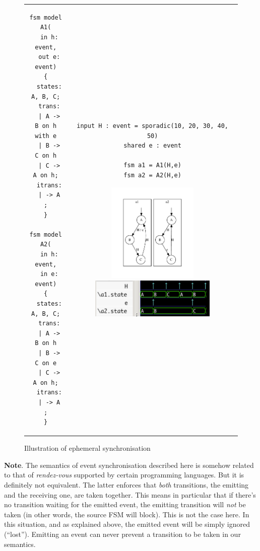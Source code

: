 \begin{figure}[h]
  \centering
\begin{tabular}[c]{cc}
  \begin{minipage}[b]{0.3\linewidth}
  \begin{lstlisting}[language=Rfsm]
fsm model A1(
  in h: event,
  out e: event)
{
  states: A, B, C;
  trans:
  | A -> B on h with e
  | B -> C on h
  | C -> A on h;
  itrans:
  | -> A ;
}

fsm model A2(
  in h: event,
  in e: event)
{
  states: A, B, C;
  trans:
  | A -> B on h
  | B -> C on e
  | C -> A on h;
  itrans:
  | -> A ;
}
  \end{lstlisting}
  \end{minipage} &
  \begin{minipage}[b]{0.7\linewidth}
\begin{lstlisting}[language=Rfsm]
input H : event = sporadic(10, 20, 30, 40, 50)
shared e : event

fsm a1 = A1(H,e)
fsm a2 = A2(H,e)
\end{lstlisting}
\includegraphics[width=0.5\textwidth]{figs/sync-ev2-model}
\includegraphics[width=0.7\textwidth]{figs/sync-ev2-chrono}
  \end{minipage}
\end{tabular}
  \caption{Illustration of ephemeral synchronisation}
  \label{fig:sync-ev2}
\end{figure}

\medskip \textbf{Note}. The semantics of event synchronisation described here is somehow related
to that of \emph{rendez-vous} supported by certain programming languages. But it is definitely not
equivalent. The latter enforces that \emph{both} transitions, the emitting and the
receiving one, are taken together. This means in particular that if there's no transition waiting
for the emitted event, the emitting transition will \emph{not} be taken (in other words, the source
FSM will block). This is not the case here. In this situation, and as explained above, the emitted
event will be simply ignored (``lost''). Emitting an event can never prevent a transition to be
taken in our semantics.

